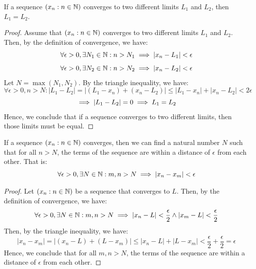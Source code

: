 \documentclass[openany]{book}
\begin{document}
\begin{mytheorem}
    If a sequence $(x_n : n \in \mathbb{N})$ converges to two different limits $L_1$ and $L_2$, then $L_1 = L_2$.
\end{mytheorem}
\begin{proof}
    Assume that $(x_n : n \in \mathbb{N})$ converges to two different limits $L_1$ and $L_2$. Then, by the definition of convergence, we have:
    $$\forall \epsilon > 0, \exists N_1 \in \mathbb{N}: n > N_1 \implies |x_n - L_1| < \epsilon$$
    $$\forall \epsilon > 0, \exists N_2 \in \mathbb{N}: n > N_2 \implies |x_n - L_2| < \epsilon$$
    Let $N = \max(N_1, N_2)$.
    By the triangle inequality, we have:
    $$\forall \epsilon > 0, n>N: |L_1 - L_2| = |(L_1 - x_n) + (x_n - L_2)| \leq |L_1 - x_n| + |x_n - L_2| < 2\epsilon$$ 
    $$\implies \left| L_1 -L_2 \right| = 0 \implies L_1 = L_2$$
    Hence, we conclude that if a sequence converges to two different limits, then those limits must be equal.
\end{proof}
\begin{mytheorem}
    If a sequence $(x_n : n \in \mathbb{N})$ converges, then we can find a natural number $N$ such that for all $n > N$, the terms of the sequence are within a distance of $\epsilon$ from each other. That is:
    $$\forall \epsilon > 0, \exists N \in \mathbb{N}: m, n > N \implies |x_n - x_m| < \epsilon$$
\end{mytheorem}
\begin{proof}
    Let $(x_n : n \in \mathbb{N})$ be a sequence that converges to $L$. Then, by the definition of convergence, we have:
    $$\forall \epsilon > 0, \exists N \in \mathbb{N}: m , n > N \implies |x_n - L| < \frac{\epsilon}{2} \wedge |x_m - L| < \frac{\epsilon}{2}$$
    Then, by the triangle inequality, we have:
    $$|x_n - x_m| = |(x_n - L) + (L - x_m)| \leq |x_n - L| + |L - x_m| < \frac{\epsilon}{2} + \frac{\epsilon}{2} = \epsilon$$
    Hence, we conclude that for all $m, n > N$, the terms of the sequence are within a distance of $\epsilon$ from each other.
\end{proof}
\end{document}
